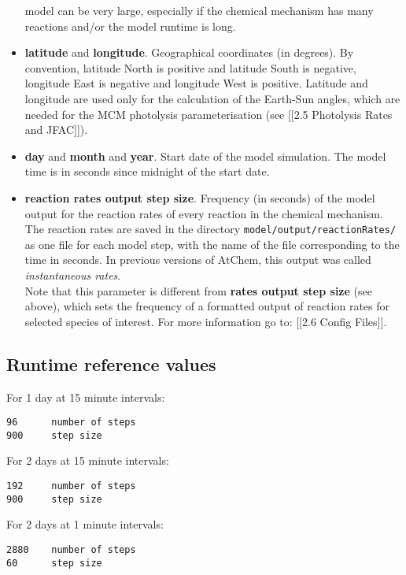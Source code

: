 \begin{itemize}
model can be very large, especially if the chemical mechanism has many
reactions and/or the model runtime is long.
\item \textbf{latitude} and \textbf{longitude}. Geographical
coordinates (in degrees). By convention, latitude North is positive
and latitude South is negative, longitude East is negative and
longitude West is positive. Latitude and longitude are used only for
the calculation of the Earth-Sun angles, which are needed for the MCM
photolysis parameterisation (see {[}{[}2.5 Photolysis Rates and
JFAC{]}{]}).
\item \textbf{day} and \textbf{month} and \textbf{year}. Start date of
the model simulation. The model time is in seconds since midnight of
the start date.
\item \textbf{reaction rates output step size}. Frequency (in seconds)
of the model output for the reaction rates of every reaction in the
chemical mechanism. The reaction rates are saved in the directory
\texttt{model/output/reactionRates/} as one file for each model step,
with the name of the file corresponding to the time in seconds. In
previous versions of AtChem, this output was called
\emph{instantaneous rates}.\\ Note that this parameter is different
from \textbf{rates output step size} (see above), which sets the
frequency of a formatted output of reaction rates for selected species
of interest. For more information go to: {[}{[}2.6 Config Files{]}{]}.
\end{itemize}

\subsection{Runtime reference values} \label{subsec:runtime-reference-values}

For 1 day at 15 minute intervals:

\begin{verbatim}
96      number of steps
900     step size
\end{verbatim}

For 2 days at 15 minute intervals:

\begin{verbatim}
192     number of steps
900     step size
\end{verbatim}

For 2 days at 1 minute intervals:

\begin{verbatim}
2880    number of steps
60      step size
\end{verbatim}

